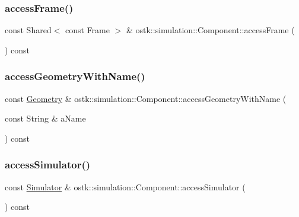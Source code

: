 \subsubsection{\texorpdfstring{access\+Frame()}{accessFrame()}}
{\footnotesize\ttfamily const Shared$<$ const Frame $>$ \& ostk\+::simulation\+::\+Component\+::access\+Frame (\begin{DoxyParamCaption}{ }\end{DoxyParamCaption}) const}

\mbox{\label{classostk_1_1simulation_1_1_component_afe2d126a21b7a96d0b3655ebcac3a6be}} 
\subsubsection{\texorpdfstring{access\+Geometry\+With\+Name()}{accessGeometryWithName()}}
{\footnotesize\ttfamily const \hyperlink{classostk_1_1simulation_1_1component_1_1_geometry}{Geometry} \& ostk\+::simulation\+::\+Component\+::access\+Geometry\+With\+Name (\begin{DoxyParamCaption}\item[{const String \&}]{a\+Name }\end{DoxyParamCaption}) const}

\mbox{\label{classostk_1_1simulation_1_1_component_a0e119aa1a610b08b935789a7ecb19605}} 
\subsubsection{\texorpdfstring{access\+Simulator()}{accessSimulator()}}
{\footnotesize\ttfamily const \hyperlink{classostk_1_1simulation_1_1_simulator}{Simulator} \& ostk\+::simulation\+::\+Component\+::access\+Simulator (\begin{DoxyParamCaption}{ }\end{DoxyParamCaption}) const}

